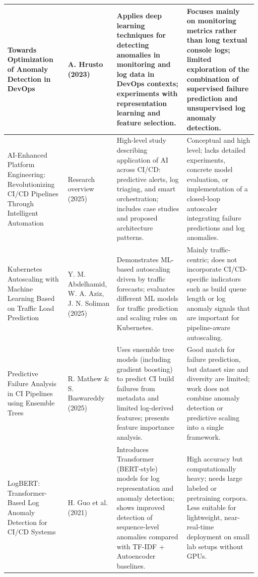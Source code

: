 \documentclass[12pt]{report}
\begin{document}
\begin{longtable}{|p{3.9cm}|p{2.9cm}|p{4.0cm}|p{3.4cm}|}
Towards Optimization of Anomaly Detection in DevOps &
A. Hrusto (2023) &
Applies deep learning techniques for detecting anomalies in monitoring and log data in DevOps contexts; experiments with representation learning and feature selection. &
Focuses mainly on monitoring metrics rather than long textual console logs; limited exploration of the combination of supervised failure prediction and unsupervised log anomaly detection. \\
\hline

AI-Enhanced Platform Engineering: Revolutionizing CI/CD Pipelines Through Intelligent Automation &
Research overview (2025) &
High-level study describing application of AI across CI/CD: predictive alerts, log triaging, and smart orchestration; includes case studies and proposed architecture patterns. &
Conceptual and high level; lacks detailed experiments, concrete model evaluation, or implementation of a closed-loop autoscaler integrating failure predictions and log anomalies.\\
\hline

Kubernetes Autoscaling with Machine Learning Based on Traffic Load Prediction &
Y. M. Abdelhamid, W. A. Aziz, J. N. Soliman (2025) &
Demonstrates ML-based autoscaling driven by traffic forecasts; evaluates different ML models for traffic prediction and scaling rules on Kubernetes. &
Mainly traffic-centric; does not incorporate CI/CD-specific indicators such as build queue length or log anomaly signals that are important for pipeline-aware autoscaling. \\
\hline

Predictive Failure Analysis in CI Pipelines using Ensemble Trees &
R. Mathew \& S. Baswareddy (2025) &
Uses ensemble tree models (including gradient boosting) to predict CI build failures from metadata and limited log-derived features; presents feature importance analysis. &
Good match for failure prediction, but dataset size and diversity are limited; work does not combine anomaly detection or predictive scaling into a single framework. \\
\hline

LogBERT: Transformer-Based Log Anomaly Detection for CI/CD Systems &
H. Guo et al. (2021) &
Introduces Transformer (BERT-style) models for log representation and anomaly detection; shows improved detection of sequence-level anomalies compared with TF-IDF + Autoencoder baselines. &
High accuracy but computationally heavy; needs large labeled or pretraining corpora. Less suitable for lightweight, near-real-time deployment on small lab setups without GPUs.\\
\hline


\end{longtable}
\end{document}
